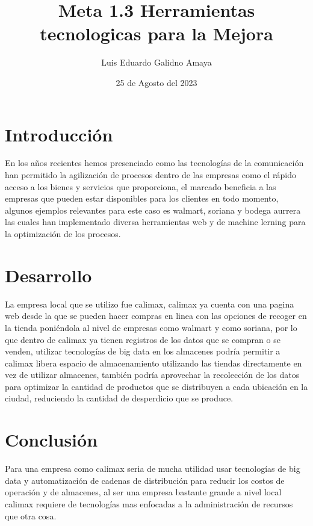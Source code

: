 \documentclass[11pt]{article}
\author{Luis Eduardo Galidno Amaya}
\date{25 de Agosto del 2023}
\title{Meta 1.3 Herramientas \\
tecnologicas para la Mejora}
\begin{document}

\section{Introducción}
\label{sec:orgb896593}
En los años recientes hemos presenciado como las tecnologías de la comunicación
han permitido la agilización de procesos dentro de las empresas como  el rápido
acceso a los bienes y servicios que proporciona, el marcado beneficia a las 
empresas que pueden estar disponibles para los clientes en todo momento, algunos
ejemplos relevantes para este caso es walmart, soriana y bodega aurrera las 
cuales han implementado diversa herramientas web y de machine lerning para 
la optimización de los procesos.  

\section{Desarrollo}
\label{sec:org9decaad}
La empresa local que se utilizo fue calimax, calimax ya cuenta con una pagina
web desde la que se pueden hacer compras en linea con las opciones de recoger 
en la tienda poniéndola al nivel de empresas como walmart y como soriana, por
lo que dentro de calimax ya tienen registros de los datos que se compran o se 
venden, utilizar tecnologías de big data en los almacenes podría permitir a 
calimax libera espacio de almacenamiento utilizando las tiendas directamente en
vez de utilizar almacenes,  también podría aprovechar la recolección de los 
datos para optimizar la cantidad de productos que se distribuyen a cada ubicación
en la ciudad, reduciendo la cantidad de desperdicio que se produce.

\section{Conclusión}
\label{sec:org377cf35}
Para una empresa como calimax seria de mucha utilidad usar tecnologías de 
big data y automatización de cadenas de distribución para reducir los costos de
operación y de almacenes, al ser una empresa bastante grande a nivel local 
calimax requiere de tecnologías mas enfocadas a la administración de recursos 
que otra cosa.
\end{document}
